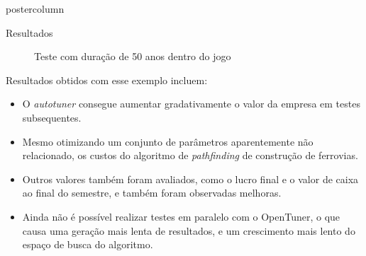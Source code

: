 \documentclass[final]{beamer}
\begin{document}
\begin{frame}
\begin{columns}
\begin{column}{.5\textwidth}
\begin{beamercolorbox}[center,wd=\textwidth]{postercolumn}
\begin{minipage}[T]{.95\textwidth}
{\begin{block}{Resultados}
                \begin{figure}[htp]
                  \centering
                  \caption{Teste com duração de 50 anos dentro do jogo}
                \end{figure}
                
                \vspace*{0.4cm}
                
                Resultados obtidos com esse exemplo incluem:
                \begin{itemize}
                  \item O \textit{autotuner} consegue aumentar gradativamente o valor da empresa em testes subsequentes.
                  \item Mesmo otimizando um conjunto de parâmetros aparentemente não relacionado, os custos do algoritmo de \textit{pathfinding} de construção de ferrovias.
                  \item Outros valores também foram avaliados, como o lucro final e o valor de caixa ao final do semestre, e também foram observadas melhoras.
                  \item Ainda não é possível realizar testes em paralelo com o OpenTuner, o que causa uma geração mais lenta de resultados, e um crescimento mais lento do espaço de busca do algoritmo.
                \end{itemize}
                
                \vspace*{0.2cm}
            \end{block}
            
%                
%                 
%                
%                
            
}
\end{minipage}
\end{beamercolorbox}
\end{column}
\end{columns}
\end{frame}
\end{document}
